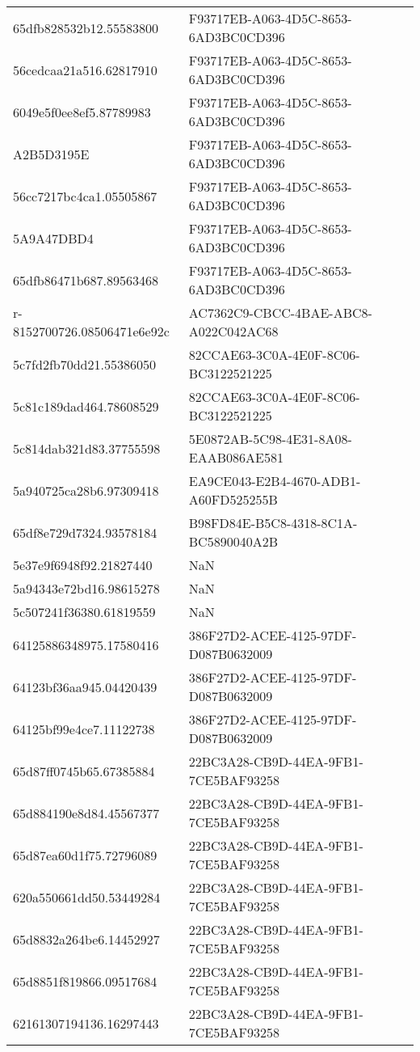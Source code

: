 \begin{tabular}{ll}
65dfb828532b12.55583800 & F93717EB-A063-4D5C-8653-6AD3BC0CD396 \\
56cedcaa21a516.62817910 & F93717EB-A063-4D5C-8653-6AD3BC0CD396 \\
6049e5f0ee8ef5.87789983 & F93717EB-A063-4D5C-8653-6AD3BC0CD396 \\
A2B5D3195E & F93717EB-A063-4D5C-8653-6AD3BC0CD396 \\
56cc7217bc4ca1.05505867 & F93717EB-A063-4D5C-8653-6AD3BC0CD396 \\
5A9A47DBD4 & F93717EB-A063-4D5C-8653-6AD3BC0CD396 \\
65dfb86471b687.89563468 & F93717EB-A063-4D5C-8653-6AD3BC0CD396 \\
r-8152700726.08506471e6e92c & AC7362C9-CBCC-4BAE-ABC8-A022C042AC68 \\
5c7fd2fb70dd21.55386050 & 82CCAE63-3C0A-4E0F-8C06-BC3122521225 \\
5c81c189dad464.78608529 & 82CCAE63-3C0A-4E0F-8C06-BC3122521225 \\
5c814dab321d83.37755598 & 5E0872AB-5C98-4E31-8A08-EAAB086AE581 \\
5a940725ca28b6.97309418 & EA9CE043-E2B4-4670-ADB1-A60FD525255B \\
65df8e729d7324.93578184 & B98FD84E-B5C8-4318-8C1A-BC5890040A2B \\
5e37e9f6948f92.21827440 & NaN \\
5a94343e72bd16.98615278 & NaN \\
5c507241f36380.61819559 & NaN \\
64125886348975.17580416 & 386F27D2-ACEE-4125-97DF-D087B0632009 \\
64123bf36aa945.04420439 & 386F27D2-ACEE-4125-97DF-D087B0632009 \\
64125bf99e4ce7.11122738 & 386F27D2-ACEE-4125-97DF-D087B0632009 \\
65d87ff0745b65.67385884 & 22BC3A28-CB9D-44EA-9FB1-7CE5BAF93258 \\
65d884190e8d84.45567377 & 22BC3A28-CB9D-44EA-9FB1-7CE5BAF93258 \\
65d87ea60d1f75.72796089 & 22BC3A28-CB9D-44EA-9FB1-7CE5BAF93258 \\
620a550661dd50.53449284 & 22BC3A28-CB9D-44EA-9FB1-7CE5BAF93258 \\
65d8832a264be6.14452927 & 22BC3A28-CB9D-44EA-9FB1-7CE5BAF93258 \\
65d8851f819866.09517684 & 22BC3A28-CB9D-44EA-9FB1-7CE5BAF93258 \\
62161307194136.16297443 & 22BC3A28-CB9D-44EA-9FB1-7CE5BAF93258 \\

\end{tabular}
